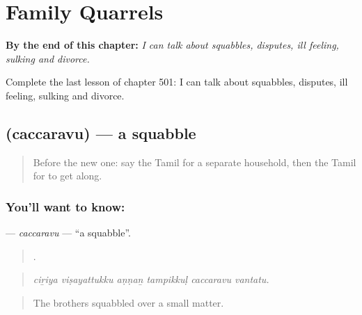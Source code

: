 
\chapter{Family Quarrels}
\label{ch:ta-family-quarrels}

\begin{chapteropening}
\textbf{By the end of this chapter:} \emph{I can talk about squabbles, disputes, ill feeling, sulking and divorce.}

Complete the last lesson of chapter 501: I can talk about squabbles, disputes, ill feeling, sulking and divorce.
\end{chapteropening}

\section[\texorpdfstring{\ta{சச்சரவு} (caccaravu)}{சச்சரவு (caccaravu)}]{ (caccaravu) — a squabble}

\label{lesson:TA-C501-caccaravu}



\begin{quote}
Before the new one: say the Tamil for a separate household, then the Tamil for to get along.
\end{quote}

\subsection*{You'll want to know: }
\textbf{} — \emph{caccaravu} — \textquotedblleft{}a squabble\textquotedblright{}.

\begin{quote}
     .
\end{quote}

\begin{quote}
\emph{ciṟiya viṣayattukku aṇṇaṉ tampikkuḷ caccaravu vantatu.}
\end{quote}

\begin{quote}
The brothers squabbled over a small matter.
\end{quote}

